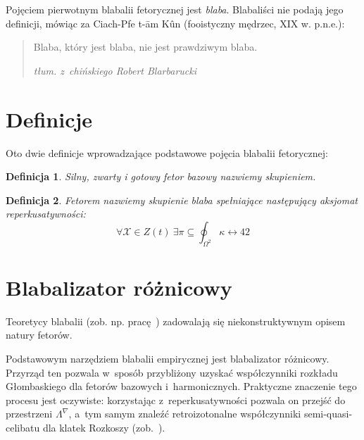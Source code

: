 \documentclass{wmiibook}
\newtheorem{defi}{Definicja}[section]
\begin{document}
Pojęciem pierwotnym blabalii fetorycznej jest \emph{blaba}.  Blabaliści nie
podają jego definicji, mówiąc za Ciach-Pfe t-\=am K\^un (fooistyczny mędrzec,
XIX w. p.n.e.):
\begin{quote}
  Blaba, który jest blaba, nie jest prawdziwym blaba.

\raggedleft\slshape tłum. z~chińskiego Robert Blarbarucki
\end{quote}

\section{Definicje}

Oto dwie definicje wprowadzające podstawowe pojęcia blabalii fetorycznej:

\begin{defi}\label{skupienie}
  Silny, zwarty i gotowy fetor bazowy nazwiemy \emph{skupieniem}.
\end{defi}

\begin{defi}\label{fetor}
  \emph{Fetorem} nazwiemy skupienie blaba spełniające następujący \emph{aksjomat
    reperkusatywności}:
  $$\forall \mathcal{X}\in Z(t)\ \exists
  \pi\subseteq\oint_{\Omega^2}\kappa\leftrightarrow 42$$
\end{defi}


\section{Blabalizator różnicowy}

Teoretycy blabalii (zob. np. pracę~\cite{grglo}) zadowalają się
niekonstruktywnym opisem natury fetorów.

Podstawowym narzędziem blabalii empirycznej jest blabalizator różnicowy.
Przyrząd ten pozwala w~sposób przybliżony uzyskać współczynniki rozkładu
Głombaskiego dla fetorów bazowych i~harmonicznych.  Praktyczne znaczenie tego
procesu jest oczywiste: korzystając z~reperkusatywności pozwala on przejść do
przestrzeni $\Lambda^{\nabla}$, a~tym samym znaleźć retroizotonalne
współczynniki semi-quasi-celibatu dla klatek Rozkoszy (zob.~\cite{JR}).
\end{document}
